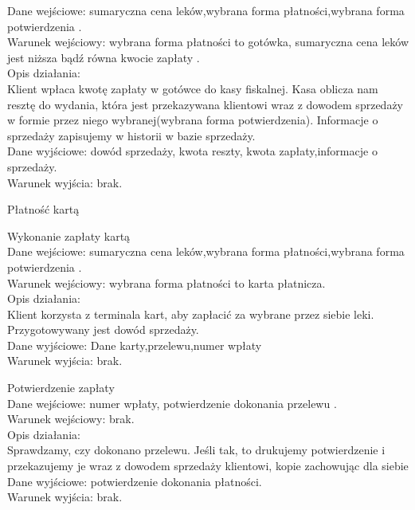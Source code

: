 \documentclass[a4paper, 11pt]{article}
\begin{document}
\begin{myEnumerate}
\begin{myEnumerate}
\begin{myEnumerate}
\begin{myEnumerate}
	Dane wejściowe: sumaryczna cena leków,wybrana forma płatności,wybrana forma potwierdzenia .\\
	Warunek wejściowy: wybrana forma płatności to gotówka, sumaryczna cena leków jest niższa bądź równa kwocie zapłaty .\\
	Opis działania:\\
		Klient wpłaca kwotę zapłaty w gotówce do kasy fiskalnej. Kasa oblicza nam resztę do wydania, która jest przekazywana klientowi wraz z dowodem sprzedaży w formie przez niego wybranej(wybrana forma potwierdzenia). Informacje o sprzedaży zapisujemy w historii w bazie sprzedaży.\\		
	Dane wyjściowe: dowód sprzedaży, kwota reszty, kwota zapłaty,informacje o sprzedaży. \\
	Warunek wyjścia: brak.\\	
	\end{myEnumerate}
		\item  Płatność kartą
		\begin{myEnumerate}
		\item  Wykonanie zapłaty kartą\\
	Dane wejściowe: sumaryczna cena leków,wybrana forma płatności,wybrana forma potwierdzenia .\\
	Warunek wejściowy: wybrana forma płatności to karta płatnicza.\\
	Opis działania:\\
		Klient korzysta z terminala kart, aby zapłacić za wybrane przez siebie leki. Przygotowywany jest dowód sprzedaży.\\		
	Dane wyjściowe: Dane karty,przelewu,numer wpłaty \\
	Warunek wyjścia: brak.\\	
	
		\item  Potwierdzenie zapłaty\\
	Dane wejściowe: numer wpłaty, potwierdzenie dokonania przelewu .\\
	Warunek wejściowy: brak.\\
	Opis działania:\\
		Sprawdzamy, czy dokonano przelewu. Jeśli tak, to drukujemy potwierdzenie i przekazujemy je wraz z dowodem sprzedaży klientowi, kopie zachowując dla siebie \\		
	Dane wyjściowe: potwierdzenie dokonania płatności. \\
	Warunek wyjścia: brak.\\
		
		\end{myEnumerate}
	\end{myEnumerate}
	

\end{myEnumerate}
\end{myEnumerate}
\end{document}
